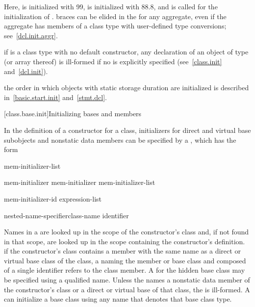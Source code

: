 Here,
is initialized with 99,
is initialized with 88.8, and
is called for the initialization of
.
\exitexample
\enternote
braces can be elided in the
for any aggregate, even if the aggregate has members of a class type with
user-defined type conversions; see~\ref{dcl.init.aggr}.
\exitnote

\pnum
\enternote
if
is a class type with no default constructor,
any declaration of an object of type
(or array thereof) is ill-formed if no
is explicitly specified (see~\ref{class.init} and~\ref{dcl.init}).
\exitnote

\pnum
\enternote
{}%
the order in which objects with static storage duration
are initialized is described in~\ref{basic.start.init} and~\ref{stmt.dcl}.
\exitnote

[class.base.init]{Initializing bases and members}%
%

\pnum
In the definition of a constructor for a class,
initializers for direct and virtual base subobjects and
nonstatic data members can be specified by a
,
which has the form

\begin{bnf}
\br
    \terminal{:} mem-initializer-list
\end{bnf}

\begin{bnf}
\br
    mem-initializer\br
    mem-initializer \terminal{,} mem-initializer-list
\end{bnf}

\begin{bnf}
\br
    mem-initializer-id \terminal{(} expression-list\opt \terminal{)}
\end{bnf}

\begin{bnf}
\br
    \terminal{::}\opt nested-name-specifier\opt class-name\br
    identifier
\end{bnf}

\pnum
Names in a  are
looked up in the scope of the constructor's class
and, if not found in that scope, are looked up in the scope containing the
constructor's definition.
\enternote
if the constructor's class contains a member with the same name as a direct
or virtual base class of the class, a
naming the member or base class and composed of a single identifier
refers to the class member.
A
for the hidden base class may be specified using a qualified name.
\exitnote
Unless the
names a nonstatic data member of the constructor's class or
a direct or virtual base of that class,
the
is ill-formed.
A
can initialize a base class using any name that denotes that base class type.
\enterexample

